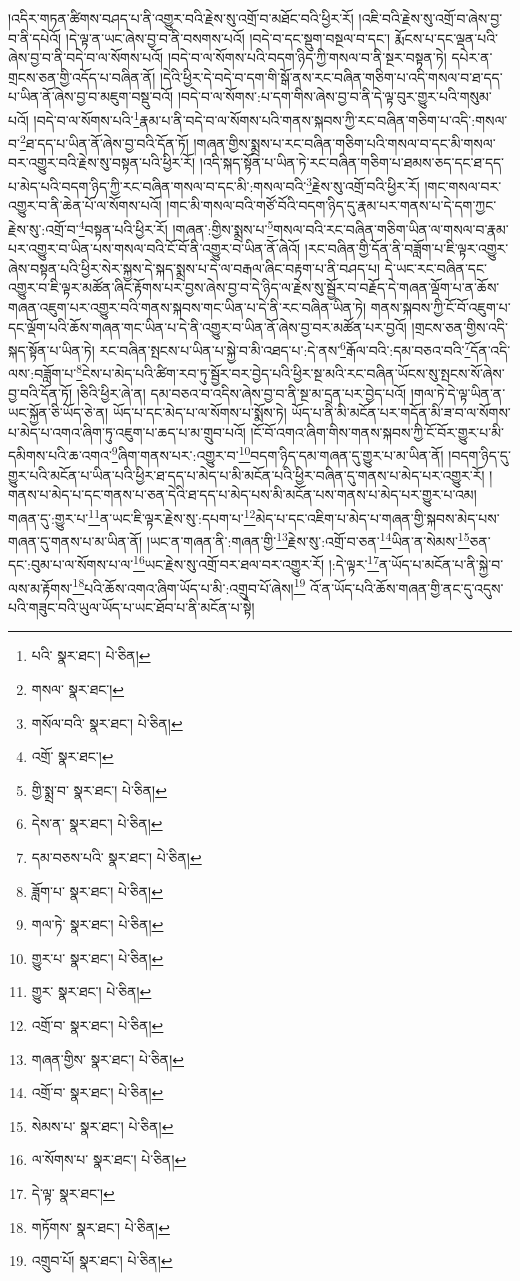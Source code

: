།འདིར་གཏན་ཚིགས་བཤད་པ་ནི་འགྱུར་བའི་རྗེས་སུ་འགྲོ་བ་མཐོང་བའི་ཕྱིར་རོ། །འཇི་བའི་རྗེས་སུ་འགྲོ་བ་ཞེས་བྱ་བ་ནི་དཔེའོ། །དེ་ལྟ་ན་ཡང་ཞེས་བྱ་བ་ནི་བསགས་པའོ། །བདེ་བ་དང་སྡུག་བསྔལ་བ་དང་། རྨོངས་པ་དང་ལྡན་པའི་ཞེས་བྱ་བ་ནི་བདེ་བ་ལ་སོགས་པའོ། །བདེ་བ་ལ་སོགས་པའི་བདག་ཉིད་ཀྱི་གསལ་བ་ནི་སྔར་བསྟན་ཏེ། དཔེར་ན་གྲངས་ཅན་གྱི་འདོད་པ་བཞིན་ནོ། །དེའི་ཕྱིར་དེ་བདེ་བ་དག་གི་སྒོ་ནས་རང་བཞིན་གཅིག་པ་འདི་གསལ་བ་ཐ་དད་པ་ཡིན་ནོ་ཞེས་བྱ་བ་མཇུག་བསྡུ་བའོ། །བདེ་བ་ལ་སོགས་:པ་དག་གིས་ཞེས་བྱ་བ་ནི་དེ་ལྟ་བུར་གྱུར་པའི་གསུམ་པའོ། །བདེ་བ་ལ་སོགས་པའི་\footnote{པའི་  སྣར་ཐང་།  པེ་ཅིན། }རྣམ་པ་ནི་བདེ་བ་ལ་སོགས་པའི་གནས་སྐབས་ཀྱི་རང་བཞིན་གཅིག་པ་འདི་:གསལ་བ་\footnote{གསལ་  སྣར་ཐང་། }ཐ་དད་པ་ཡིན་ནོ་ཞེས་བྱ་བའི་དོན་ཏོ། །གཞན་གྱིས་སྨྲས་པ་རང་བཞིན་གཅིག་པའི་གསལ་བ་དང་མི་གསལ་བར་འགྱུར་བའི་རྗེས་སུ་བསྟན་པའི་ཕྱིར་རོ། །འདི་སྐད་སྟོན་པ་ཡིན་ཏེ་རང་བཞིན་གཅིག་པ་ཐམས་ཅད་དང་ཐ་དད་པ་མེད་པའི་བདག་ཉིད་ཀྱི་རང་བཞིན་གསལ་བ་དང་མི་:གསལ་བའི་\footnote{གསོལ་བའི་  སྣར་ཐང་།  པེ་ཅིན། }རྗེས་སུ་འགྲོ་བའི་ཕྱིར་རོ། །གང་གསལ་བར་འགྱུར་བ་ནི་ཆེན་པོ་ལ་སོགས་པའོ། །གང་མི་གསལ་བའི་གཙོ་བོའི་བདག་ཉིད་དུ་རྣམ་པར་གནས་པ་དེ་དག་ཀྱང་རྗེས་སུ་:འགྲོ་བ་\footnote{འགྲོ་  སྣར་ཐང་། }བསྟན་པའི་ཕྱིར་རོ། །གཞན་:གྱིས་སྨྲས་པ་\footnote{གྱི་སྨྲ་བ་  སྣར་ཐང་།  པེ་ཅིན། }གསལ་བའི་རང་བཞིན་གཅིག་ཡིན་ལ་གསལ་བ་རྣམ་པར་འགྱུར་བ་ཡིན་པས་གསལ་བའི་ངོ་བོ་ནི་འགྱུར་བ་ཡིན་ནོ་ཞེའོ། །རང་བཞིན་གྱི་དོན་ནི་བཟློག་པ་ཇི་ལྟར་འགྱུར་ཞེས་བསྟན་པའི་ཕྱིར་སེར་སྐྱས་དེ་སྐད་སྨྲས་པ་དེ་ལ་བརྒལ་ཞིང་བརྟག་པ་ནི་བཤད་པ། དེ་ཡང་རང་བཞིན་དང་འགྱུར་བ་ཇི་ལྟར་མཚོན་ཞིང་རྟོགས་པར་བྱས་ཞེས་བྱ་བ་དེ་ཉིད་ལ་རྗེས་སུ་སྦྱོར་བ་བརྗོད་དེ་གཞན་ལྡོག་པ་ན་ཆོས་གཞན་འཇུག་པར་འགྱུར་བའི་གནས་སྐབས་གང་ཡིན་པ་དེ་ནི་རང་བཞིན་ཡིན་ཏེ། གནས་སྐབས་ཀྱི་ངོ་བོ་འཇུག་པ་དང་ལྡོག་པའི་ཆོས་གཞན་གང་ཡིན་པ་དེ་ནི་འགྱུར་བ་ཡིན་ནོ་ཞེས་བྱ་བར་མཚོན་པར་བྱའོ། །གྲངས་ཅན་གྱིས་འདི་སྐད་སྟོན་པ་ཡིན་ཏེ། རང་བཞིན་སྤངས་པ་ཡིན་པ་སྐྱེ་བ་མི་འཐད་པ་:དེ་ནས་\footnote{དེས་ན་  སྣར་ཐང་།  པེ་ཅིན། }རྒོལ་བའི་:དམ་བཅའ་བའི་\footnote{དམ་བཅས་པའི་  སྣར་ཐང་།  པེ་ཅིན། }དོན་འདི་ལས་:བཟློག་པ་\footnote{ཟློག་པ་  སྣར་ཐང་།  པེ་ཅིན། }ངེས་པ་མེད་པའི་ཚིག་རབ་ཏུ་སྦྱོར་བར་བྱེད་པའི་ཕྱིར་སྔ་མའི་རང་བཞིན་ཡོངས་སུ་སྤངས་སོ་ཞེས་བྱ་བའི་དོན་ཏོ། །ཅིའི་ཕྱིར་ཞེ་ན། དམ་བཅའ་བ་འདིས་ཞེས་བྱ་བ་ནི་སྔ་མ་དྲན་པར་བྱེད་པའོ། །གལ་ཏེ་དེ་ལྟ་ཡིན་ན་ཡང་སྐྱོན་ཅི་ཡོད་ཅེ་ན། ཡོད་པ་དང་མེད་པ་ལ་སོགས་པ་སྨོས་ཏེ། ཡོད་པ་ནི་མི་མངོན་པར་གདོན་མི་ཟ་བ་ལ་སོགས་པ་མེད་པ་འགའ་ཞིག་ཏུ་འཇུག་པ་ཆད་པ་མ་གྲུབ་པའོ། །ངོ་བོ་འགའ་ཞིག་གིས་གནས་སྐབས་ཀྱི་ངོ་བོར་གྱུར་པ་མི་དམིགས་པའི་ཆ་འགའ་\footnote{གལ་ཏེ་  སྣར་ཐང་།  པེ་ཅིན། }ཞིག་གནས་པར་:འགྱུར་བ་\footnote{གྱུར་པ་  སྣར་ཐང་།  པེ་ཅིན། }བདག་ཉིད་དམ་གཞན་དུ་གྱུར་པ་མ་ཡིན་ནོ། །བདག་ཉིད་དུ་གྱུར་པའི་མངོན་པ་ཡིན་པའི་ཕྱིར་ཐ་དད་པ་མེད་པ་མི་མངོན་པའི་ཕྱིར་བཞིན་དུ་གནས་པ་མེད་པར་འགྱུར་རོ། །གནས་པ་མེད་པ་དང་གནས་པ་ཅན་དེའི་ཐ་དད་པ་མེད་པས་མི་མངོན་པས་གནས་པ་མེད་པར་གྱུར་པ་འམ། གཞན་དུ་:གྱུར་པ་\footnote{གྱུར་  སྣར་ཐང་།  པེ་ཅིན། }ན་ཡང་ཇི་ལྟར་རྗེས་སུ་:དཔག་པ་\footnote{འགྲོ་བ་  སྣར་ཐང་།  པེ་ཅིན། }མེད་པ་དང་འཇིག་པ་མེད་པ་གཞན་གྱི་སྐབས་མེད་པས་གཞན་དུ་གནས་པ་མ་ཡིན་ནོ། །ཡང་ན་གཞན་ནི་:གཞན་གྱི་\footnote{གཞན་གྱིས་  སྣར་ཐང་།  པེ་ཅིན། }རྗེས་སུ་:འགྲོ་བ་ཅན་\footnote{འགྲོ་བ་  སྣར་ཐང་།  པེ་ཅིན། }ཡིན་ན་སེམས་\footnote{སེམས་པ་  སྣར་ཐང་།  པེ་ཅིན། }ཅན་དང་:བུམ་པ་ལ་སོགས་པ་ལ་\footnote{ལ་སོགས་པ་  སྣར་ཐང་།  པེ་ཅིན། }ཡང་རྗེས་སུ་འགྲོ་བར་ཐལ་བར་འགྱུར་རོ། །:དེ་ལྟར་\footnote{དེ་ལྟ་  སྣར་ཐང་། }ན་ཡོད་པ་མངོན་པ་ནི་སྐྱེ་བ་ལས་མ་རྟོགས་\footnote{གཏོགས་  སྣར་ཐང་།  པེ་ཅིན། }པའི་ཆོས་འགའ་ཞིག་ཡོད་པ་མི་:འགྲུབ་པོ་ཞེས།\footnote{འགྲུབ་པོ།  སྣར་ཐང་།  པེ་ཅིན། } འོ་ན་ཡོད་པའི་ཆོས་གཞན་གྱི་ནང་དུ་འདུས་པའི་གཟུང་བའི་ཡུལ་ཡོད་པ་ཡང་ཐོབ་པ་ནི་མངོན་པ་སྟེ། 